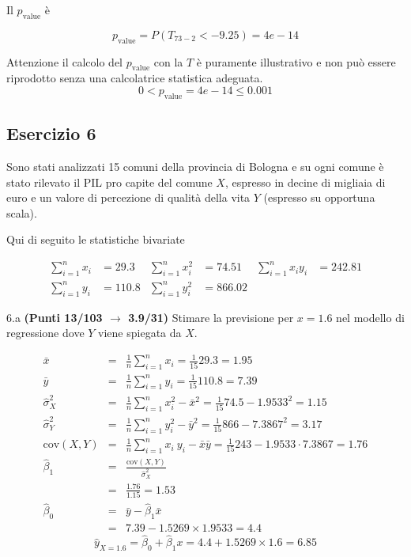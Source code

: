 \documentclass[
  11pt,
]{book}
\theoremstyle{mytheoremstyle}
\theoremstyle{mydefstyle}
\newenvironment{sol}
  {
  \begin{tcolorbox}[enhanced,breakable,arc=0.1mm,boxrule=1pt,colback=white,colframe=iblue,
  title=\bf \fontfamily{lmss}\selectfont \hspace{.5 cm} Soluzione,drop fuzzy shadow]

}{
\end{tcolorbox}
  }
\begin{document}
\begin{sol}
Il \(p_{\text{value}}\) è

\[ p_{\text{value}} = P(T_{73-2}<-9.25)=4e-14 \]

Attenzione il calcolo del \(p_\text{value}\) con la \(T\) è puramente illustrativo e non può essere riprodotto senza una calcolatrice statistica adeguata.\[
 0 < p_\text{value}= 4e-14 \leq 0.001 
\]

\end{sol}

\subsection{Esercizio 6}\label{esercizio-6-15}

Sono stati analizzati 15 comuni della provincia di Bologna e su ogni comune è stato rilevato
il PIL pro capite del comune \(X\), espresso in decine di migliaia di euro e un valore di percezione di
qualità della vita \(Y\) (espresso su opportuna scala).

Qui di seguito le statistiche bivariate

\begin{align*}
  \sum_{i=1}^n x_i &= 29.3 &\sum_{i=1}^n x_i^2 &= 74.51 &\sum_{i=1}^n x_i y_i &= 242.81\\
  \sum_{i=1}^n y_i &= 110.8 & \sum_{i=1}^n y_i^2 &= 866.02 &
\end{align*}

6.a \textbf{(Punti 13/103 \(\rightarrow\) 3.9/31)} Stimare la previsione per \(x=1.6\) nel modello di regressione dove \(Y\) viene spiegata da \(X\).

\begin{sol}
\begin{eqnarray*}
           \bar x &=&\frac 1 n\sum_{i=1}^n x_i = \frac {1}{ 15 }  29.3 =  1.95 \\
           \bar y &=&\frac 1 n\sum_{i=1}^n y_i = \frac {1}{ 15 }  110.8 =  7.39 \\
           \hat\sigma_X^2&=&\frac 1 n\sum_{i=1}^n x_i^2-\bar x^2=\frac {1}{ 15 }  74.5  - 1.9533 ^2= 1.15 \\
           \hat\sigma_Y^2&=&\frac 1 n\sum_{i=1}^n y_i^2-\bar y^2=\frac {1}{ 15 }  866  - 7.3867 ^2= 3.17 \\
           \text{cov}(X,Y)&=&\frac 1 n\sum_{i=1}^n x_i~y_i-\bar x\bar y=\frac {1}{ 15 }  243 - 1.9533 \cdot 7.3867 = 1.76 \\
           \hat\beta_1 &=& \frac{\text{cov}(X,Y)}{\hat\sigma_X^2} \\
                    &=& \frac{ 1.76 }{ 1.15 }  =  1.53 \\
           \hat\beta_0 &=& \bar y - \hat\beta_1 \bar x\\
                    &=&  7.39 - 1.5269 \times  1.9533 = 4.4 
         \end{eqnarray*}\[\hat y_{X= 1.6 }=\hat\beta_0+\hat\beta_1 x= 4.4 + 1.5269 \times 1.6 = 6.85 \]

\end{sol}
\end{document}
